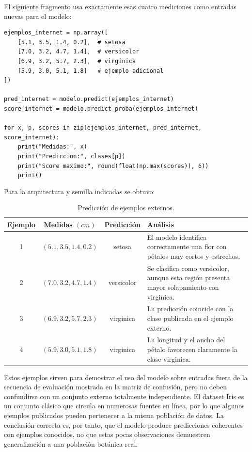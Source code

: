 \documentclass[14pt,twoside]{article}
\begin{document}
El siguiente fragmento usa exactamente esas cuatro mediciones como entradas nuevas para el modelo:

\begin{lstlisting}[style=pgpython,caption={Predicción de ejemplos de medidas publicados en Internet.}]
ejemplos_internet = np.array([
    [5.1, 3.5, 1.4, 0.2],  # setosa
    [7.0, 3.2, 4.7, 1.4],  # versicolor
    [6.9, 3.2, 5.7, 2.3],  # virginica
    [5.9, 3.0, 5.1, 1.8]   # ejemplo adicional
])

pred_internet = modelo.predict(ejemplos_internet)
score_internet = modelo.predict_proba(ejemplos_internet)

for x, p, scores in zip(ejemplos_internet, pred_internet, score_internet):
    print("Medidas:", x)
    print("Prediccion:", clases[p])
    print("Score maximo:", round(float(np.max(scores)), 6))
    print()
\end{lstlisting}

Para la arquitectura y semilla indicadas se obtuvo:

\begin{table}[H]
\centering
\caption{Predicción de ejemplos externos.}
\begin{tabularx}{\textwidth}{c c c X}
\toprule
Ejemplo & Medidas $(cm)$ & Predicción & Análisis \\
\midrule
1 & $(5.1,3.5,1.4,0.2)$ & setosa & El modelo identifica correctamente una flor con pétalos muy cortos y estrechos. \\
2 & $(7.0,3.2,4.7,1.4)$ & versicolor & Se clasifica como versicolor, aunque esta región presenta mayor solapamiento con virginica. \\
3 & $(6.9,3.2,5.7,2.3)$ & virginica & La predicción coincide con la clase publicada en el ejemplo externo. \\
4 & $(5.9,3.0,5.1,1.8)$ & virginica & La longitud y el ancho del pétalo favorecen claramente la clase virginica. \\
\bottomrule
\end{tabularx}
\end{table}

Estos ejemplos sirven para demostrar el uso del modelo sobre entradas fuera de la secuencia de evaluación mostrada en la matriz de confusión, pero no deben confundirse con un conjunto externo totalmente independiente. El dataset Iris es un conjunto clásico que circula en numerosas fuentes en línea, por lo que algunos ejemplos publicados pueden pertenecer a la misma población de datos. La conclusión correcta es, por tanto, que el modelo produce predicciones coherentes con ejemplos conocidos, no que estas pocas observaciones demuestren generalización a una población botánica real.
\end{document}
